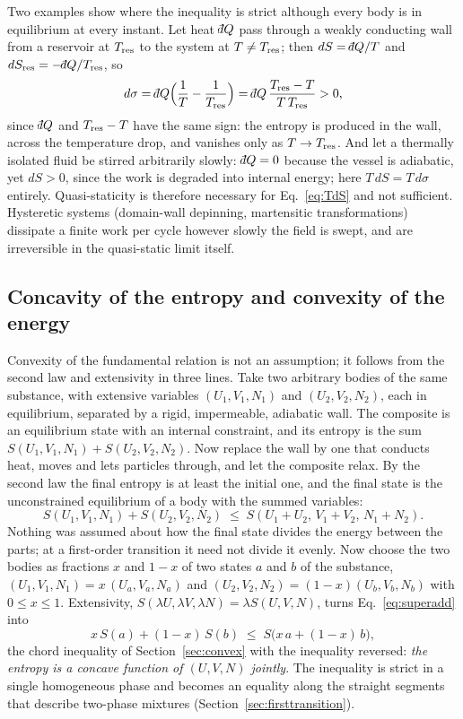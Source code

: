 \documentclass[10pt,a4paper]{article}
\theoremstyle{remark}
\newcommand{\dbar}{\mathchar'26\mkern-11mu d}
\begin{document}
Two examples show where the inequality is strict although every body is in
equilibrium at every instant. Let heat $\dbar Q$ pass through a weakly
conducting wall from a reservoir at $T_{\rm res}$ to the system at $T\neq
T_{\rm res}$; then $dS=\dbar Q/T$ and $dS_{\rm res}=-\dbar Q/T_{\rm res}$, so
\[
  d\sigma=\dbar Q\Big(\frac{1}{T}-\frac{1}{T_{\rm res}}\Big)
  =\dbar Q\,\frac{T_{\rm res}-T}{T\,T_{\rm res}}>0 ,
\]
since $\dbar Q$ and $T_{\rm res}-T$ have the same sign: the entropy is produced
in the wall, across the temperature drop, and vanishes only as $T\to T_{\rm res}$.
And let a thermally isolated fluid be stirred arbitrarily slowly: $\dbar Q=0$
because the vessel is adiabatic, yet $dS>0$, since the work is degraded into
internal energy; here $T\,dS=T\,d\sigma$ entirely. Quasi-staticity is therefore
necessary for Eq.~\eqref{eq:TdS} and not sufficient. Hysteretic systems
(domain-wall depinning, martensitic transformations) dissipate a finite work
per cycle however slowly the field is swept, and are irreversible in the
quasi-static limit itself.

\subsection{Concavity of the entropy and convexity of the energy}
\label{sec:whyconvex}

Convexity of the fundamental relation is not an assumption; it follows from
the second law and extensivity in three lines. Take two arbitrary bodies of
the same substance, with extensive variables $(U_1,V_1,N_1)$ and
$(U_2,V_2,N_2)$, each in equilibrium, separated by a rigid, impermeable,
adiabatic wall. The composite is an equilibrium state with an internal
constraint, and its entropy is the sum $S(U_1,V_1,N_1)+S(U_2,V_2,N_2)$. Now
replace the wall by one that conducts heat, moves and lets particles through,
and let the composite relax. By the second law the final entropy is at least
the initial one, and the final state is the unconstrained equilibrium of a
body with the summed variables:
\begin{equation}\label{eq:superadd}
  S(U_1,V_1,N_1)+S(U_2,V_2,N_2)\;\leq\;S(U_1+U_2,\,V_1+V_2,\,N_1+N_2) .
\end{equation}
Nothing was assumed about how the final state divides the energy between the
parts; at a first-order transition it need not divide it evenly. Now choose
the two bodies as fractions $x$ and $1-x$ of two states $a$ and $b$ of the
substance, $(U_1,V_1,N_1)=x\,(U_a,V_a,N_a)$ and $(U_2,V_2,N_2)=(1-x)(U_b,V_b,N_b)$
with $0\leq x\leq1$. Extensivity, $S(\lambda U,\lambda V,\lambda N)=\lambda S(U,V,N)$,
turns Eq.~\eqref{eq:superadd} into
\begin{equation}\label{eq:Sconcave}
  x\,S(a)+(1-x)\,S(b)\;\leq\;S\big(x\,a+(1-x)\,b\big) ,
\end{equation}
the chord inequality of Section~\ref{sec:convex} with the inequality reversed:
\emph{the entropy is a concave function of $(U,V,N)$ jointly}. The
inequality is strict in a single homogeneous phase and becomes an equality
along the straight segments that describe two-phase mixtures
(Section~\ref{sec:firsttransition}).
\end{document}
